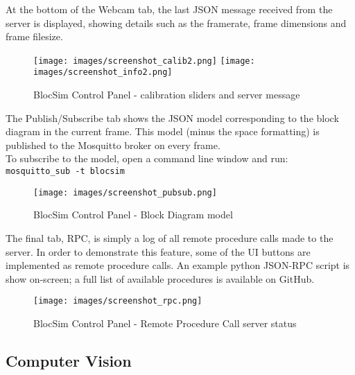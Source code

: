 At the bottom of the Webcam tab, the last JSON message received from the server is displayed, showing details such as the framerate, frame dimensions and frame filesize.
\\

\begin{figure}[ht!]
\centering
\texttt{[image: images/screenshot\_calib2.png]} %
\texttt{[image: images/screenshot\_info2.png]}
\caption{BlocSim Control Panel - calibration sliders and server message \cite{blocsim}}
\label{im:screenshot_calib}
\end{figure}

\newpage
The Publish/Subscribe tab shows the JSON model corresponding to the block diagram in the current frame. This model (minus the space formatting) is published to the Mosquitto broker on every frame.
\\

To subscribe to the model, open a command line window and run: \\ \texttt{mosquitto\_sub -t blocsim}

\begin{figure}[ht!]
\centering
\texttt{[image: images/screenshot\_pubsub.png]}
\caption{BlocSim Control Panel - Block Diagram model \cite{blocsim}}
\label{im:screenshot_pubsub}
\end{figure}

\newpage

The final tab, RPC, is simply a log of all remote procedure calls made to the server. In order to demonstrate this feature, some of the UI buttons are implemented as remote procedure calls. An example python JSON-RPC script is show on-screen; a full list of available procedures is available on GitHub.

\begin{figure}[ht!]
\centering
\texttt{[image: images/screenshot\_rpc.png]}
\caption{BlocSim Control Panel - Remote Procedure Call server status \cite{blocsim}}
\label{im:screenshot_rpc}
\end{figure}


\newpage

\subsection{Computer Vision}

